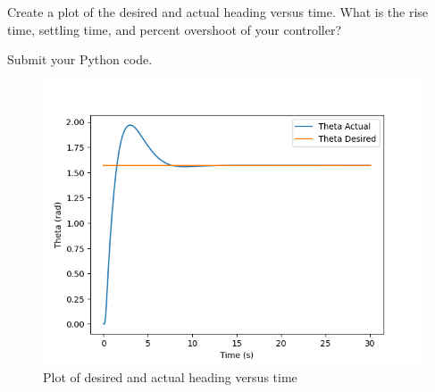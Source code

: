 \documentclass{article}
\begin{document}
\bigskip
\noindent Create a plot of the desired and actual heading versus time. What is the rise time, settling time, and 
percent overshoot of your controller? 

\bigskip
\noindent Submit your Python code.

\begin{figure}[H]
  \centering
  \includegraphics[width=\textwidth]{question4.png}
  \caption*{Plot of desired and actual heading versus time}
\end{figure}

\begin{verbatim}
\end{verbatim}
\end{document}
